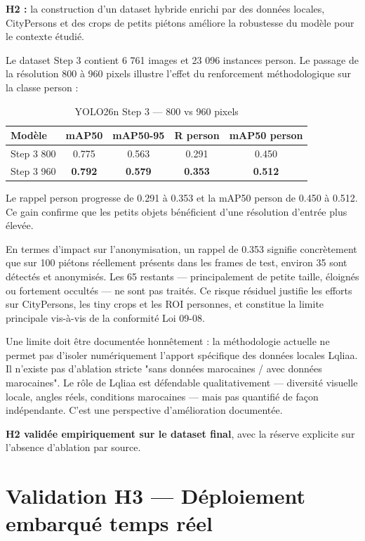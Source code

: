 \textbf{H2 :} la construction d'un dataset
hybride enrichi par des données locales,
CityPersons et des crops de petits piétons
améliore la robustesse du modèle pour le
contexte étudié.

Le dataset Step 3 contient 6 761 images
et 23 096 instances person. Le passage
de la résolution 800 à 960 pixels illustre
l'effet du renforcement méthodologique
sur la classe person :

\begin{table}[H]
\centering
\caption{YOLO26n Step 3 — 800 vs 960 pixels}
\begin{tabularx}{\textwidth}{lcccc}
\toprule
\textbf{Modèle} &
\textbf{mAP50} &
\textbf{mAP50-95} &
\textbf{R person} &
\textbf{mAP50 person} \\
\midrule
Step 3 800 &
0.775 & 0.563 & 0.291 & 0.450 \\
\rowcolor{PrimaryBlue!10}
Step 3 960 &
\textbf{0.792} & \textbf{0.579} &
\textbf{0.353} & \textbf{0.512} \\
\bottomrule
\end{tabularx}
\label{tab:800_vs_960}
\end{table}

Le rappel person progresse de 0.291 à
0.353 et la mAP50 person de 0.450 à
0.512. Ce gain confirme que les petits
objets bénéficient d'une résolution
d'entrée plus élevée.

En termes d'impact sur l'anonymisation,
un rappel de 0.353 signifie concrètement
que sur 100 piétons réellement présents
dans les frames de test, environ 35 sont
détectés et anonymisés. Les 65 restants
— principalement de petite taille,
éloignés ou fortement occultés — ne sont
pas traités. Ce risque résiduel justifie
les efforts sur CityPersons, les tiny
crops et les ROI personnes, et constitue
la limite principale vis-à-vis de la
conformité Loi 09-08.

Une limite doit être documentée
honnêtement : la méthodologie actuelle
ne permet pas d'isoler numériquement
l'apport spécifique des données locales
Lqliaa. Il n'existe pas d'ablation
stricte "sans données marocaines / avec
données marocaines". Le rôle de Lqliaa
est défendable qualitativement — diversité
visuelle locale, angles réels, conditions
marocaines — mais pas quantifié de façon
indépendante. C'est une perspective
d'amélioration documentée.

\textbf{H2 validée empiriquement sur
le dataset final}, avec la réserve
explicite sur l'absence d'ablation
par source.

\section{Validation H3 — Déploiement
         embarqué temps réel}

